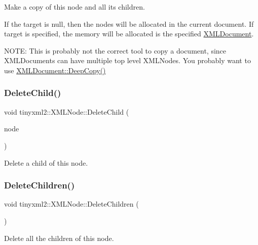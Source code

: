 Make a copy of this node and all its children.

If the \textquotesingle{}target\textquotesingle{} is null, then the nodes will be allocated in the current document. If \textquotesingle{}target\textquotesingle{} is specified, the memory will be allocated is the specified \mbox{\hyperlink{classtinyxml2_1_1_x_m_l_document}{X\+M\+L\+Document}}.

N\+O\+TE\+: This is probably not the correct tool to copy a document, since X\+M\+L\+Documents can have multiple top level X\+M\+L\+Nodes. You probably want to use \mbox{\hyperlink{classtinyxml2_1_1_x_m_l_document_af592ffc91514e25a39664521ac83db45}{X\+M\+L\+Document\+::\+Deep\+Copy()}} \mbox{\label{classtinyxml2_1_1_x_m_l_node_a363b6edbd6ebd55f8387d2b89f2b0921}} 
\subsubsection{\texorpdfstring{Delete\+Child()}{DeleteChild()}}
{\footnotesize\ttfamily void tinyxml2\+::\+X\+M\+L\+Node\+::\+Delete\+Child (\begin{DoxyParamCaption}\item[{\mbox{\hyperlink{classtinyxml2_1_1_x_m_l_node}{X\+M\+L\+Node}} $\ast$}]{node }\end{DoxyParamCaption})}

Delete a child of this node. \mbox{\label{classtinyxml2_1_1_x_m_l_node_a0360085cc54df5bff85d5c5da13afdce}} 
\subsubsection{\texorpdfstring{Delete\+Children()}{DeleteChildren()}}
{\footnotesize\ttfamily void tinyxml2\+::\+X\+M\+L\+Node\+::\+Delete\+Children (\begin{DoxyParamCaption}{ }\end{DoxyParamCaption})}

Delete all the children of this node. \mbox{\label{classtinyxml2_1_1_x_m_l_node_ae7dc225e1018cdd685f7563593a1fe08}} 
